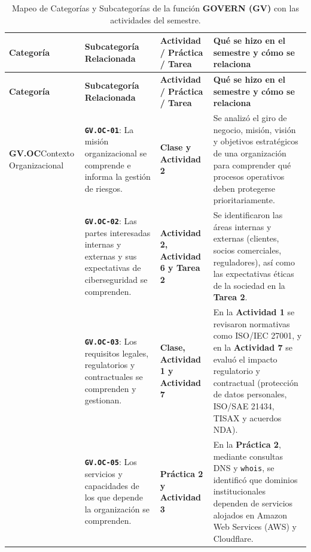 \documentclass[letterpaper,11pt]{article}
\begin{document}
\begingroup
\scriptsize
\setlength{\tabcolsep}{4pt}
\renewcommand{\arraystretch}{1.24}
\begin{longtable}{|L{2.8cm}|L{4.5cm}|L{2.9cm}|L{6.5cm}|}
\caption{Mapeo de Categorías y Subcategorías de la función \textbf{GOVERN (GV)} con las actividades del semestre.}
\label{tab:mapeo-gv} \\
\hline
{}
\textbf{Categoría} & \textbf{Subcategoría Relacionada} & \textbf{Actividad / Práctica / Tarea} & \textbf{Qué se hizo en el semestre y cómo se relaciona} \\
\hline
\endfirsthead
\hline
{}
\textbf{Categoría} & \textbf{Subcategoría Relacionada} & \textbf{Actividad / Práctica / Tarea} & \textbf{Qué se hizo en el semestre y cómo se relaciona} \\
\hline
\endhead
\hline
\endfoot

\textbf{GV.OC}\newline Contexto Organizacional &
\textbf{\texttt{GV.OC-01}}: La misión organizacional se comprende e informa la gestión de riesgos. &
\textbf{Clase y Actividad 2} &
Se analizó el giro de negocio, misión, visión y objetivos estratégicos de una organización para comprender qué procesos operativos deben protegerse prioritariamente. \\
\nopagebreak
 &
\textbf{\texttt{GV.OC-02}}: Las partes interesadas internas y externas y sus expectativas de ciberseguridad se comprenden. &
\textbf{Actividad 2, Actividad 6 y Tarea 2} &
Se identificaron las áreas internas y externas (clientes, socios comerciales, reguladores), así como las expectativas éticas de la sociedad en la \textbf{Tarea 2}. \\
\nopagebreak
 &
\textbf{\texttt{GV.OC-03}}: Los requisitos legales, regulatorios y contractuales se comprenden y gestionan. &
\textbf{Clase, Actividad 1 y Actividad 7} &
En la \textbf{Actividad 1} se revisaron normativas como ISO/IEC 27001, y en la \textbf{Actividad 7} se evaluó el impacto regulatorio y contractual (protección de datos personales, ISO/SAE 21434, TISAX y acuerdos NDA). \\
\nopagebreak
 &
\textbf{\texttt{GV.OC-05}}: Los servicios y capacidades de los que depende la organización se comprenden. &
\textbf{Práctica 2 y Actividad 3} &
En la \textbf{Práctica 2}, mediante consultas DNS y \texttt{whois}, se identificó que dominios institucionales dependen de servicios alojados en Amazon Web Services (AWS) y Cloudflare. \\
\hline


\end{longtable}
\end{document}
